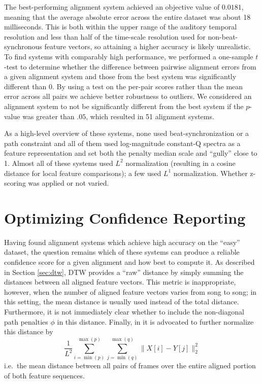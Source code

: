 \documentclass{article}
\begin{document}
The best-performing alignment system achieved an objective value of $0.0181$, meaning that the average absolute error across the entire dataset was about 18 milliseconds.
This is both within the upper range of the auditory temporal resolution and less than half of the time-scale resolution used for non-beat-synchronous feature vectors, so attaining a higher accuracy is likely unrealistic.
To find systems with comparably high performance, we performed a one-sample $t$-test to determine whether the difference between pairwise alignment errors from a given alignment system and those from the best system was significantly different than 0.
By using a test on the per-pair scores rather than the mean error across all pairs we achieve better robustness to outliers.
We considered an alignment system to not be significantly different from the best system if the $p$-value was greater than $.05$, which resulted in 51 alignment systems.

As a high-level overview of these systems, none used beat-synchronization or a path constraint and all of them used log-magnitude constant-Q spectra as a feature representation and set both the penalty median scale and ``gully'' close to 1.
Almost all of these systems used $L^2$ normalization (resulting in a cosine distance for local feature comparisons); a few used $L^1$ normalization.
Whether z-scoring was applied or not varied.

\section{Optimizing Confidence Reporting}
\label{sec:confidence}

Having found alignment systems which achieve high accuracy on the ``easy'' dataset, the question remains which of these systems can produce a reliable confidence score for a given alignment and how best to compute it.
As described in Section \ref{sec:dtw}, DTW provides a ``raw'' distance by simply summing the distances between all aligned feature vectors.
This metric is inappropriate, however, when the number of aligned feature vectors varies from song to song; in this setting, the mean distance is usually used instead of the total distance.
Furthermore, it is not immediately clear whether to include the non-diagonal path penalties $\phi$ in this distance.
Finally, in \cite{raffel2015large} it is advocated to further normalize this distance by
$$
\frac{1}{L^2} \sum_{i = \min(p)}^{\max(p)} \sum_{j = \min(q)}^{\max(q)} \|X[i] - Y[j]\|_2^2
$$
i.e.\ the mean distance between all pairs of frames over the entire aligned portion of both feature sequences.
\end{document}
